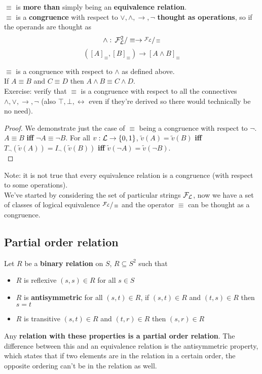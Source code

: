 \documentclass[11pt]{article}
\begin{document}
	$\equiv$ is \textbf{more than} simply being an \textbf{equivalence relation}. \\
	
	$\equiv$ is a \textbf{congruence} with respect to $\vee, \wedge, \rightarrow, \neg$ \textbf{thought as operations}, so if the operands are thought as
	$$ \wedge : \, \mathcal{F}_\mathcal{L}^2/\equiv \rightarrow \sfrac{\mathcal{F}_\mathcal{L}}{\equiv} $$
	$$ ([A]_\equiv, [B]_\equiv) \rightarrow [A \wedge B]_\equiv $$
	
	$\equiv$ is a congruence with respect to $\wedge$ as defined above.\\
	If $A \equiv B$ and $C \equiv D$ then $A \wedge B \equiv C \wedge D$.\\
	
	Exercise: verify that $\equiv$ is a congruence with respect to all the connectives $\wedge, \vee, \rightarrow, \neg$ (also $\top, \bot, \leftrightarrow$ even if they're derived so there would technically be no need).\\
	
	\begin{proof}
		We demonstrate just the case of $\equiv$ being a congruence with respect to $\neg$.\\
		$A \equiv B$ \textbf{iff} $\neg A \equiv \neg B$. For all $v: \mathcal{L} \rightarrow \{0,1\}$, $\tilde{v}(A) = \tilde{v}(B)$ \textbf{iff} $T_\neg (\tilde{v}(A)) = I_\neg (\tilde{v}(B))$ \textbf{iff} $\tilde{v}(\neg A) = \tilde{v}(\neg B)$.\\
	\end{proof}
	
	Note: it is not true that every equivalence relation is a congruence (with respect to some operations).\\
	
	We've started by considering the set of particular strings $\mathcal{F}_\mathcal{L}$, now we have a set of classes of logical equivalence $\sfrac{\mathcal{F}_\mathcal{L}}{\equiv}$ and the operator $\equiv$ can be thought as a congruence.\\
	
	\newpage
	
	\subsection{Partial order relation} 
	
	Let $R$ be a \textbf{binary relation} on $S$, $R \subseteq S^2$ such that 
	\begin{itemize}
		\item $R$ is reflexive $(s, s) \in R$ for all $s \in S$
		\item $R$ is \textbf{antisymmetric} for all $(s,t) \in R$, if $(s,t) \in R$ and $(t,s) \in R$ then $s = t$
		\item $R$ is transitive $(s,t) \in R$ and $(t,r) \in R$ then $(s,r) \in R$
	\end{itemize}
	Any \textbf{relation with these properties is a partial order relation}. The difference between this and an equivalence relation is the antisymmetric property, which states that if two elements are in the relation in a certain order, the opposite ordering can't be in the relation as well.\\
	
\end{document}
